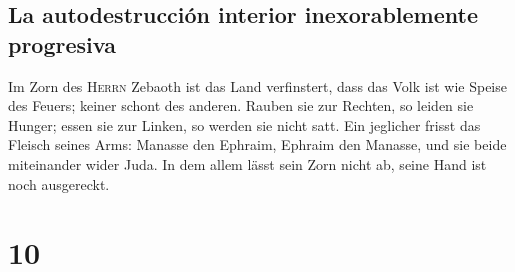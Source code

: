 \hypertarget{la-autodestrucciuxf3n-interior-inexorablemente-progresiva}{%
\subsection{La autodestrucción interior inexorablemente
progresiva}\label{la-autodestrucciuxf3n-interior-inexorablemente-progresiva}}

 Im Zorn des \textsc{Herrn} Zebaoth ist das Land
verfinstert, dass das Volk ist wie Speise des Feuers; keiner schont des
anderen.  Rauben sie zur Rechten, so leiden sie Hunger;
essen sie zur Linken, so werden sie nicht satt. Ein jeglicher frisst das
Fleisch seines Arms:  Manasse den Ephraim, Ephraim den
Manasse, und sie beide miteinander wider Juda. In dem allem lässt sein
Zorn nicht ab, seine Hand ist noch ausgereckt.

\hypertarget{section-9}{%
\section{10}\label{section-9}}

